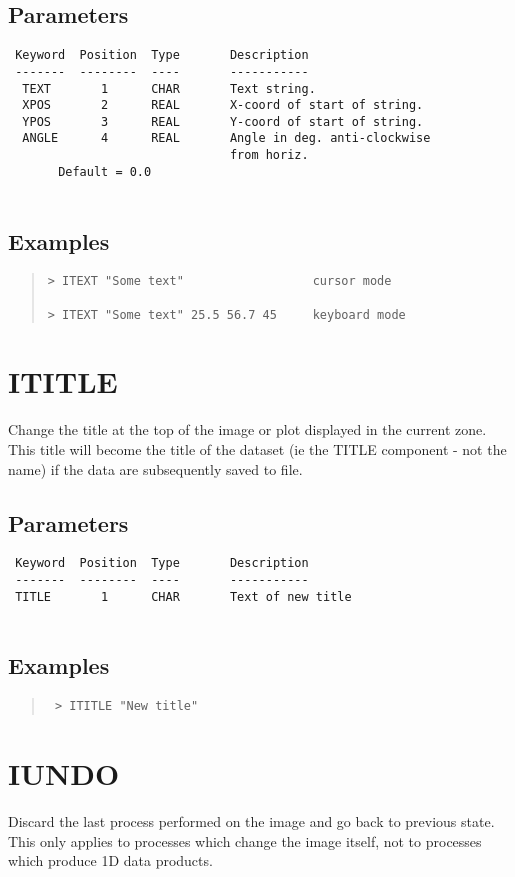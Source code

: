 \documentclass{book}
\renewcommand{\_}{{\tt\char'137}}     %
\begin{document}
\subsection{Parameters}
\begin{verbatim}
 Keyword  Position  Type       Description
 -------  --------  ----       -----------
  TEXT       1      CHAR       Text string.
  XPOS       2      REAL       X-coord of start of string.
  YPOS       3      REAL       Y-coord of start of string.
  ANGLE      4      REAL       Angle in deg. anti-clockwise
                               from horiz.
       Default = 0.0
 
\end{verbatim}\subsection{Examples}
\begin{quote}\begin{verbatim}
> ITEXT "Some text"                  cursor mode
 
> ITEXT "Some text" 25.5 56.7 45     keyboard mode
\end{verbatim}\end{quote}
\section{ITITLE}
Change the title at the top of the image or plot displayed in the
current zone. This title will become the title of the dataset
(ie the TITLE component - not the name) if the data are subsequently
saved to file.
 
\subsection{Parameters}
\begin{verbatim}
 Keyword  Position  Type       Description
 -------  --------  ----       -----------
 TITLE       1      CHAR       Text of new title
 
\end{verbatim}\subsection{Examples}
\begin{quote}\begin{verbatim}
 > ITITLE "New title"
 \end{verbatim}\end{quote}
\section{IUNDO}
Discard the last process performed on the image and go back to
previous state. This only applies to processes which change
the image itself, not to processes which produce 1D data
products.
 
\end{document}
